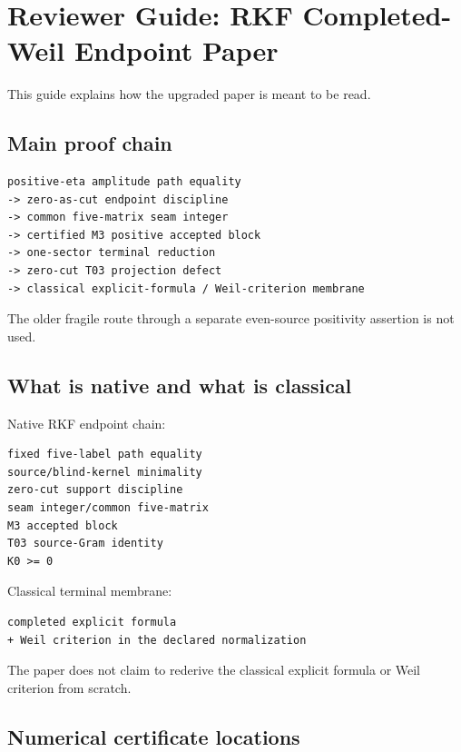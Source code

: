 \hypertarget{reviewer-guide-rkf-completed-weil-endpoint-paper}{%
\chapter{Reviewer Guide: RKF Completed-Weil Endpoint Paper}\label{reviewer-guide-rkf-completed-weil-endpoint-paper}}

This guide explains how the upgraded paper is meant to be read.

\hypertarget{main-proof-chain}{%
\section{Main proof chain}\label{main-proof-chain}}

\begin{verbatim}
positive-eta amplitude path equality
-> zero-as-cut endpoint discipline
-> common five-matrix seam integer
-> certified M3 positive accepted block
-> one-sector terminal reduction
-> zero-cut T03 projection defect
-> classical explicit-formula / Weil-criterion membrane
\end{verbatim}

The older fragile route through a separate even-source positivity assertion is not used.

\hypertarget{what-is-native-and-what-is-classical}{%
\section{What is native and what is classical}\label{what-is-native-and-what-is-classical}}

Native RKF endpoint chain:

\begin{verbatim}
fixed five-label path equality
source/blind-kernel minimality
zero-cut support discipline
seam integer/common five-matrix
M3 accepted block
T03 source-Gram identity
K0 >= 0
\end{verbatim}

Classical terminal membrane:

\begin{verbatim}
completed explicit formula
+ Weil criterion in the declared normalization
\end{verbatim}

The paper does not claim to rederive the classical explicit formula or Weil criterion from scratch.

\hypertarget{numerical-certificate-locations}{%
\section{Numerical certificate locations}\label{numerical-certificate-locations}}

